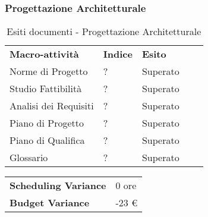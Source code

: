 \subsubsection{Progettazione Architetturale}
\begin{table}[!ht]
			\centering
				\begin{tabular}{|l|l|l|ll}
					\cline{1-3}
					 \textbf{Macro-attività}  & \textbf{Indice \glossaryItem{Gulpease}}  & \textbf{Esito}  &  \\ \cline{1-3}
					 Norme di Progetto  & ? & Superato &  \\ \cline{1-3}
					 Studio Fattibilità & ? & Superato &  \\ \cline{1-3}
					 Analisi dei Requisiti & ? & Superato &  \\ \cline{1-3}
					 Piano di Progetto & ? & Superato &  \\ \cline{1-3}
					 Piano di Qualifica & ? & Superato &  \\ \cline{1-3}
					 Glossario & ? & Superato &  \\ \cline{1-3}
				\end{tabular}
				\caption{Esiti  documenti - Progettazione Architetturale}
		\end{table}
		\begin{table}[!ht]
		\centering
		\begin{tabular}{l|l}
		\textbf{Scheduling Variance} & 0 ore \\
		\textbf{Budget Variance} & -23 \euro{} \\
		\end{tabular}
		\end{table}

